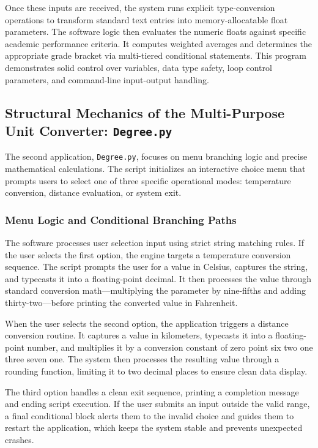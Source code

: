 \documentclass[12pt,a4paper]{article}
\begin{document}
Once these inputs are received, the system runs explicit type-conversion operations to transform standard text entries into memory-allocatable float parameters. The software logic then evaluates the numeric floats against specific academic performance criteria. It computes weighted averages and determines the appropriate grade bracket via multi-tiered conditional statements. This program demonstrates solid control over variables, data type safety, loop control parameters, and command-line input-output handling.

\subsection{Structural Mechanics of the Multi-Purpose Unit Converter: \texttt{Degree.py}}
The second application, \texttt{Degree.py}, focuses on menu branching logic and precise mathematical calculations. The script initializes an interactive choice menu that prompts users to select one of three specific operational modes: temperature conversion, distance evaluation, or system exit.

\subsubsection{Menu Logic and Conditional Branching Paths}
The software processes user selection input using strict string matching rules. If the user selects the first option, the engine targets a temperature conversion sequence. The script prompts the user for a value in Celsius, captures the string, and typecasts it into a floating-point decimal. It then processes the value through standard conversion math—multiplying the parameter by nine-fifths and adding thirty-two—before printing the converted value in Fahrenheit.

When the user selects the second option, the application triggers a distance conversion routine. It captures a value in kilometers, typecasts it into a floating-point number, and multiplies it by a conversion constant of zero point six two one three seven one. The system then processes the resulting value through a rounding function, limiting it to two decimal places to ensure clean data display. 

The third option handles a clean exit sequence, printing a completion message and ending script execution. If the user submits an input outside the valid range, a final conditional block alerts them to the invalid choice and guides them to restart the application, which keeps the system stable and prevents unexpected crashes.
\end{document}
